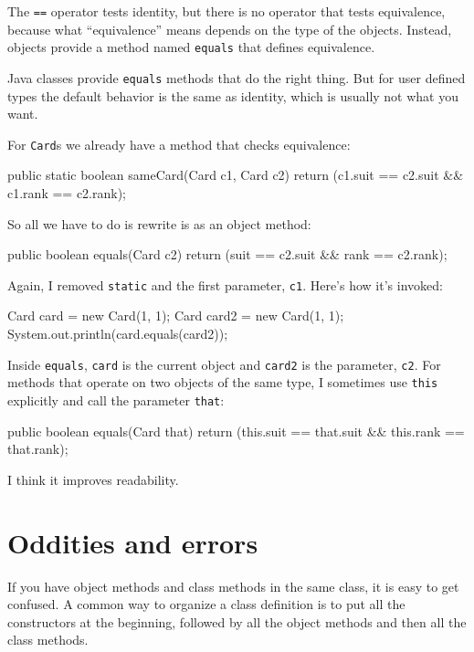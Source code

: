 The {\tt ==} operator tests identity, but there is no operator
that tests equivalence, because what ``equivalence'' means
depends on the type of the objects.  Instead, objects provide
a method named {\tt equals} that defines equivalence.

Java classes provide {\tt equals} methods that do the right
thing.  But for user defined types the default behavior is the
same as identity, which is usually not what you want.

For {\tt Card}s we already have a method that checks equivalence:

\begin{code}
    public static boolean sameCard(Card c1, Card c2) {
        return (c1.suit == c2.suit && c1.rank == c2.rank);
    }
\end{code}
%
So all we have to do is rewrite is as an object method:

\begin{code}
    public boolean equals(Card c2) {
        return (suit == c2.suit && rank == c2.rank);
    }
\end{code}
%
Again, I removed {\tt static} and the first parameter, {\tt c1}.
Here's how it's invoked:

\begin{code}
    Card card = new Card(1, 1);
    Card card2 = new Card(1, 1);
    System.out.println(card.equals(card2));
\end{code}
%
Inside {\tt equals}, {\tt card} is the current object and {\tt card2}
is the parameter, {\tt c2}.  For methods that operate on two objects
of the same type, I sometimes use {\tt this} explicitly and call
the parameter {\tt that}:

\begin{code}
    public boolean equals(Card that) {
        return (this.suit == that.suit && this.rank == that.rank);
    }
\end{code}
%
I think it improves readability.


\section{Oddities and errors}

If you have object methods and class methods in the same class, it is
easy to get confused.  A common way to organize a class definition is
to put all the constructors at the beginning, followed by all the
object methods and then all the class methods.

